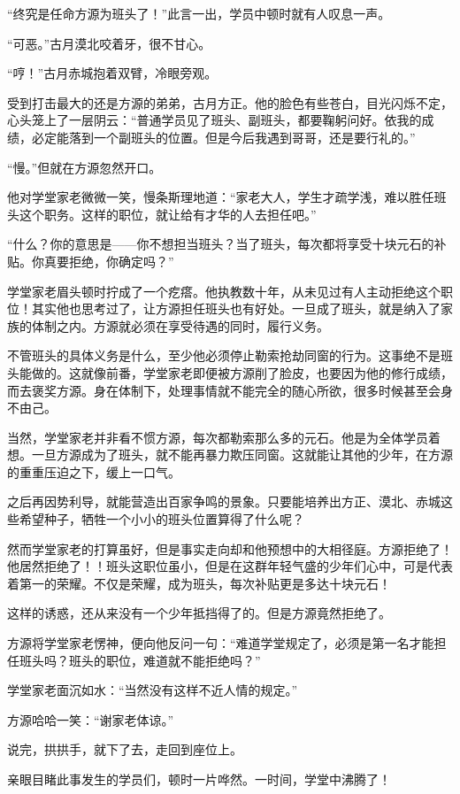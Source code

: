 \begin{this_body}
“终究是任命方源为班头了！”此言一出，学员中顿时就有人叹息一声。

“可恶。”古月漠北咬着牙，很不甘心。

“哼！”古月赤城抱着双臂，冷眼旁观。

受到打击最大的还是方源的弟弟，古月方正。他的脸色有些苍白，目光闪烁不定，心头笼上了一层阴云：“普通学员见了班头、副班头，都要鞠躬问好。依我的成绩，必定能落到一个副班头的位置。但是今后我遇到哥哥，还是要行礼的。”

“慢。”但就在方源忽然开口。

他对学堂家老微微一笑，慢条斯理地道：“家老大人，学生才疏学浅，难以胜任班头这个职务。这样的职位，就让给有才华的人去担任吧。”

“什么？你的意思是——你不想担当班头？当了班头，每次都将享受十块元石的补贴。你真要拒绝，你确定吗？”

学堂家老眉头顿时拧成了一个疙瘩。他执教数十年，从未见过有人主动拒绝这个职位！其实他也思考过了，让方源担任班头也有好处。一旦成了班头，就是纳入了家族的体制之内。方源就必须在享受待遇的同时，履行义务。

不管班头的具体义务是什么，至少他必须停止勒索抢劫同窗的行为。这事绝不是班头能做的。这就像前番，学堂家老即便被方源削了脸皮，也要因为他的修行成绩，而去褒奖方源。身在体制下，处理事情就不能完全的随心所欲，很多时候甚至会身不由己。

当然，学堂家老并非看不惯方源，每次都勒索那么多的元石。他是为全体学员着想。一旦方源成为了班头，就不能再暴力欺压同窗。这就能让其他的少年，在方源的重重压迫之下，缓上一口气。

之后再因势利导，就能营造出百家争鸣的景象。只要能培养出方正、漠北、赤城这些希望种子，牺牲一个小小的班头位置算得了什么呢？

然而学堂家老的打算虽好，但是事实走向却和他预想中的大相径庭。方源拒绝了！他居然拒绝了！！班头这职位虽小，但是在这群年轻气盛的少年们心中，可是代表着第一的荣耀。不仅是荣耀，成为班头，每次补贴更是多达十块元石！

这样的诱惑，还从来没有一个少年抵挡得了的。但是方源竟然拒绝了。

方源将学堂家老愣神，便向他反问一句：“难道学堂规定了，必须是第一名才能担任班头吗？班头的职位，难道就不能拒绝吗？”

学堂家老面沉如水：“当然没有这样不近人情的规定。”

方源哈哈一笑：“谢家老体谅。”

说完，拱拱手，就下了去，走回到座位上。

亲眼目睹此事发生的学员们，顿时一片哗然。一时间，学堂中沸腾了！


\end{this_body}
